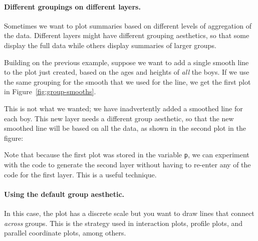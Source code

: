 \paragraph{Different groupings on different layers.}  Sometimes we want to plot summaries based on different levels of aggregation of the data. Different layers might have different grouping aesthetics, so that some display the full data while others display summaries of larger groups.

Building on the previous example, suppose we want to add a single smooth line to the plot just created, based on the ages and heights of {\em all} the boys.  If we use the same grouping for the smooth that we used for the line, we get the first plot in Figure~\ref{fig:group-smooths}.  

% 


This is not what we wanted; we have inadvertently added a smoothed line for each boy. This new layer needs a different group aesthetic, so that the new smoothed line will be based on all the data, as shown in the second plot in the figure:

% 


% 

 
Note that because the first plot was stored in the variable {\tt p}, we can experiment with the code to generate the second layer without having to re-enter any of the code for the first layer.  This is a useful technique.

\paragraph{Using the default group aesthetic.}  In this case, the plot has a discrete scale but you want to draw lines that connect {\em across} groups.  This is the strategy used in interaction plots, profile plots, and parallel coordinate plots, among others.  

